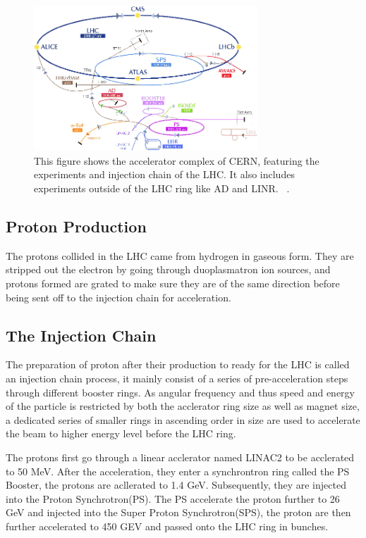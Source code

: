 \begin{figure}[!htb]
    \begin{center}
        \includegraphics[width=0.75\textwidth]{figures/chapter_ATLAS/LHCAcceleratorComplex}
        \caption{
			This figure shows the accelerator complex of CERN, featuring the experiments and injection chain of the LHC. It also includes experiments outside of the LHC ring like AD and LINR. ~\cite{Marcastel:1621583}.
        }
        \label{fig:CERNAcceleratorComplex}
    \end{center}
\end{figure}



\subsection{Proton Production}
The protons collided in the LHC came from hydrogen in gaseous form. They are stripped out the electron by going through duoplasmatron ion sources, and protons formed are grated to make sure they are of the same direction before being sent off to the injection chain for acceleration. 

\subsection{The Injection Chain}
The preparation of proton after their production to ready for the LHC is called an injection chain process, it mainly consist of a series of pre-acceleration steps through different booster rings. As angular frequency and thus speed and energy of the particle is restricted by both the acclerator ring size as well as magnet size, a dedicated series of smaller rings in ascending order in size are used to accelerate the beam to higher energy level before the LHC ring.

The protons first go through a linear acclerator named LINAC2 to be acclerated to 50 MeV. After the acceleration, they enter a synchrontron ring called the PS Booster, the protons are acllerated to 1.4 GeV. Subsequently, they are injected into the Proton Synchrotron(PS). The PS accelerate the proton further to  26 GeV and injected into the Super Proton Synchrotron(SPS), the proton are then further accelerated to 450 GEV and passed onto the LHC ring in bunches.  

